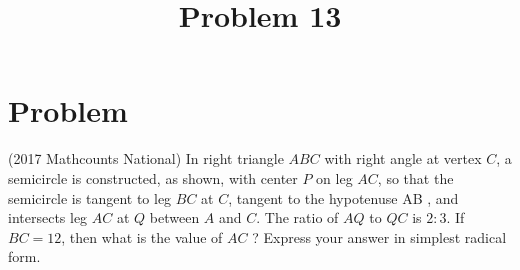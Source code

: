 \documentclass{article}
\title{Problem 13}
\date{}
\begin{document}
\maketitle

\section*{Problem}
(2017 Mathcounts National) In right triangle \(A B C\) with right angle at vertex \(C\), a semicircle is constructed, as shown, with center \(P\) on leg \(A C\), so that the semicircle is tangent to leg \(B C\) at \(C\), tangent to the hypotenuse AB , and intersects leg \(A C\) at \(Q\) between \(A\) and \(C\). The ratio of \(A Q\) to \(Q C\) is \(2: 3\). If \(B C=12\), then what is the value of \(A C\) ? Express your answer in simplest radical form.
\end{document}
